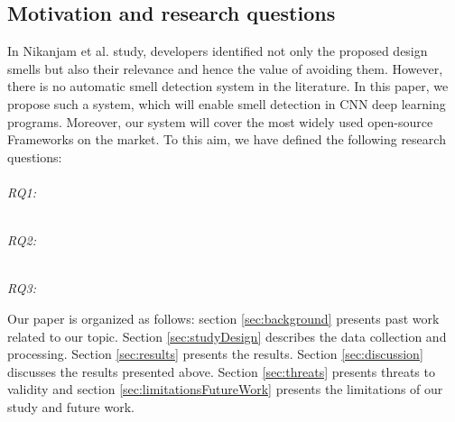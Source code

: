 \subsection{Motivation and research questions}
In Nikanjam et al. study, developers identified not only the proposed design smells but also their relevance and hence the value of avoiding them. However, there is no automatic smell detection system in the literature. In this paper, we propose such a system, which will enable smell detection in CNN deep learning programs. Moreover, our system will cover the most widely used open-source Frameworks on the market. To this aim, we have defined the following research questions:\\

\emph{\\RQ1:\RQOne} %

\emph{\\RQ2:\RQTwo} %

\emph{\\RQ3:\RQThree} %

Our paper is organized as follows: section \ref{sec:background} presents past work related to our topic. Section \ref{sec:studyDesign} describes the data collection and processing. Section \ref{sec:results} presents the results. Section \ref{sec:discussion} discusses the results presented above. Section \ref{sec:threats} presents threats to validity and section \ref{sec:limitationsFutureWork} presents the limitations of our study and future work.
